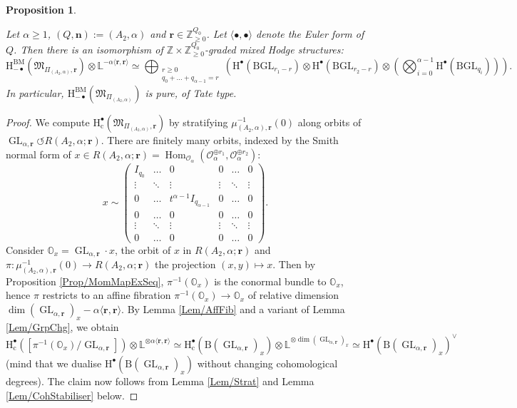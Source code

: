 \documentclass[11pt,english]{article}
\numberwithin{equation}{section}
\numberwithin{figure}{section}
\theoremstyle{definition}
\theoremstyle{plain}
\newtheorem{prop}[df]{Proposition}
\theoremstyle{remark}
\DeclareMathOperator{\Hom}{Hom}
\DeclareMathOperator{\GL}{GL}
\newcommand\nn{\mathbf{n}}
\newcommand\rr{\mathbf{r}}
\newcommand\HH{\mathrm{H}}
\newcommand\ZZ{\mathbb{Z}}
\begin{document}
\begin{prop} \label{Prop/BMhomPreprojStA2}

Let $\alpha\geq1$, $(Q,\nn):=(A_{2},\alpha)$ and $\rr\in\ZZ_{\geq0}^{Q_{0}}$.
Let $\langle\bullet,\bullet\rangle$ denote the Euler form of $Q$.
Then there is an isomorphism of $\ZZ\times\ZZ_{\geq0}^{Q_{0}}$-graded
mixed Hodge structures:\[
\HH_{-\bullet}^{\mathrm{BM}}\left(\mathfrak{M}_{\Pi_{(A_{2},\alpha)},\rr}\right)\otimes\mathbb{L}^{-\alpha\langle\rr,\rr\rangle}
\simeq
\bigoplus_{\substack{r\geq0 \\ q_0+\ldots+q_{\alpha-1}=r}}
\left(
\HH^{\bullet}(\mathrm{BGL}_{r_1-r})\otimes\HH^{\bullet}(\mathrm{BGL}_{r_2-r})\otimes\left(\bigotimes_{i=0}^{\alpha-1}\HH^{\bullet}(\mathrm{BGL}_{q_i})\right)
\right)
.
\]In particular, $\HH_{-\bullet}^{\mathrm{BM}}\left(\mathfrak{M}_{\Pi_{(A_{2},\alpha)}}\right)$
is pure, of Tate type.

\end{prop}

\begin{proof}

We compute $\HH_{\mathrm{c}}^{\bullet}\left(\mathfrak{M}_{\Pi_{(A_{2},\alpha)},\rr}\right)$
by stratifying $\mu_{(A_{2},\alpha),\rr}^{-1}(0)$ along orbits of
$\GL_{\alpha,\rr}\circlearrowleft R(A_{2},\alpha;\rr)$. There are
finitely many orbits, indexed by the Smith normal form \cite{Sta16}
of $x\in R(A_{2},\alpha;\rr)=\Hom_{\mathcal{O}_{\alpha}}(\mathcal{O}_{\alpha}^{\oplus r_{1}},\mathcal{O}_{\alpha}^{\oplus r_{2}})$:\[
x\sim
\left(
\begin{array}{cccccc}
I_{q_0} & \ldots & 0 & 0 & \ldots & 0 \\
\vdots & \ddots & \vdots & \vdots & \ddots & \vdots \\
0 & \ldots & t^{\alpha-1}I_{q_{\alpha-1}} & 0 & \ldots & 0 \\
0 & \ldots & 0 & 0 & \ldots & 0 \\
\vdots & \ddots & \vdots & \vdots & \ddots & \vdots \\
0 & \ldots & 0 & 0 & \ldots & 0
\end{array}
\right)
.
\]Consider $\mathbb{O}_{x}=\GL_{\alpha,\rr}\cdot x$, the orbit of $x$
in $R(A_{2},\alpha;\rr)$ and $\pi:\mu_{(A_{2},\alpha),\rr}^{-1}(0)\rightarrow R(A_{2},\alpha;\rr)$
the projection $(x,y)\mapsto x$. Then by Proposition \ref{Prop/MomMapExSeq},
$\pi^{-1}(\mathbb{O}_{x})$ is the conormal bundle to $\mathbb{O}_{x}$,
hence $\pi$ restricts to an affine fibration $\pi^{-1}(\mathbb{O}_{x})\rightarrow\mathbb{O}_{x}$
of relative dimension $\dim(\GL_{\alpha,\rr})_{x}-\alpha\langle\rr,\rr\rangle$.
By Lemma \ref{Lem/AffFib} and a variant of Lemma \ref{Lem/GrpChg},
we obtain $\HH_{\mathrm{c}}^{\bullet}\left([\pi^{-1}(\mathbb{O}_{x})/\GL_{\alpha,\rr}]\right)\otimes\mathbb{L}^{\otimes\alpha\langle\rr,\rr\rangle}\simeq\HH_{\mathrm{c}}^{\bullet}(\mathrm{B}(\GL_{\alpha,\rr})_{x})\otimes\mathbb{L}^{\otimes\dim(\GL_{\alpha,\rr})_{x}}\simeq\HH^{\bullet}(\mathrm{B}(\GL_{\alpha,\rr})_{x})^{\vee}$
(mind that we dualise $\HH^{\bullet}(\mathrm{B}(\GL_{\alpha,\rr})_{x})$
without changing cohomological degrees). The claim now follows from
Lemma \ref{Lem/Strat} and Lemma \ref{Lem/CohStabiliser} below. \end{proof}
\end{document}
